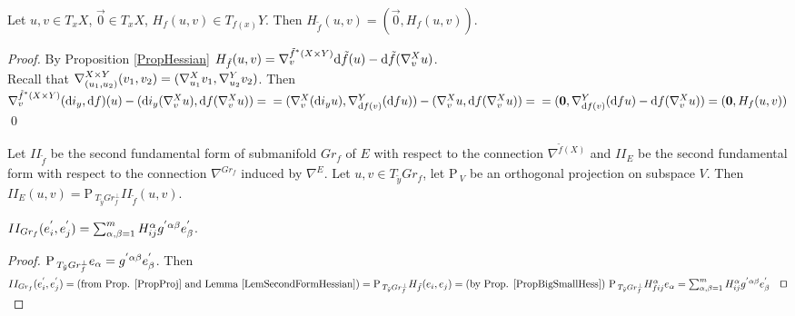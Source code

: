 \documentclass{llncs}
\newcommand{\Proj}{\mathrm{P}{\,}}
\newcommand{\CovariantDiffManif}[1]{\nabla^{#1}}
\newcommand{\CovariantDerivManif}[2]{\tensor*{\nabla}{^{#1}_{#2}}}
\newcommand{\Diff}{\mathrm{d}}
\newcommand {\Preimage}[2]{{#2}^*{#1}}
\begin{document}
\begin{proposition} \label{PropBigSmallHess}
Let $u, v \in T_xX$, $\vec{0} \in T_xX$, $H_f(u, v) \in T_{f(x)}Y$.
Then $H_{\tilde{f}}(u, v) = (\vec{0}, H_f(u, v))$.
\end{proposition}

\begin{proof}
By Proposition \ref{PropHessian} 
$H_{\tilde{f}}(u, v)=\CovariantDerivManif{\Preimage{(X \times Y)}{\tilde{f}}} {v} \Diff \tilde{f}(u) - 
							\Diff \tilde{f}( 
							\CovariantDerivManif{X}{v}u
							)$.
\\
Recall that $\CovariantDerivManif{X\times Y}{(u_1, u_2)}{(v_1, v_2)} = (\CovariantDerivManif{X}{u_1}{v_1}, \CovariantDerivManif{Y}{u_2}{v_2})$. Then
							\\
							$\CovariantDerivManif{\Preimage{(X \times Y)}{\tilde{f}}}{v} (\Diff i_y, \Diff f)(u) 							
							 - (\Diff i_y( 
							\CovariantDerivManif{X}{v}u
							), \Diff f( 
							\CovariantDerivManif{X}{v}u
							)) = 
							\\
							=(\CovariantDerivManif{X}{v} (\Diff i_y u), \CovariantDerivManif{Y}{\Diff f(v)} (\Diff f u)) - 
							(\CovariantDerivManif{X}{v}u, \Diff f( 
							\CovariantDerivManif{X}{v}u)
							) =
							\\
							=(\vec{0}, \CovariantDerivManif{Y}{\Diff f(v)} (\Diff f u) - \Diff f( 
							\CovariantDerivManif{X}{v}u)) =
							(\vec{0}, H_f(u, v))$ \textrm{\qed }

\end{proof}

\begin{proposition} \label{PropProj}
Let $II_{\tilde{f}}$ be the second fundamental form of submanifold $Gr_f$ of $E$ with respect to the connection $\CovariantDiffManif{\tilde{f}(X)}$ and $II_E$ be the second fundamental form with respect to the connection $\CovariantDiffManif{Gr_f}$ induced by $\CovariantDiffManif{E}$. 
Let $u, v \in T_{\tilde{y}}Gr_f$, let $\Proj_V$ be an orthogonal projection on subspace $V$. Then $II_E(u, v) = \Proj_{T_{\tilde{y}}Gr_f^{\bot}} II_{\tilde{f}}(u, v)$.
\end{proposition}

\begin{lemma} \label{LemSecondHessianFormula}
$II_{Gr_f}(e_i^{'}, e_j^{'})=\sum_{\alpha, \beta=1}^{m} \tensor*{H}{^{\alpha}_i_j} \tensor*{g}{^{'}^{\alpha}^{\beta}} e_{\beta}^{'}$.
\end{lemma}

\begin{proof}
$\Proj_{T_{\tilde{y}}Gr_f^{\bot}}e_{\alpha} = \tensor*{g}{^{'}^{\alpha}^{\beta}} e_{\beta}^{'}$. Then 
$
II_{Gr_f}(e_i^{'}, e_j^{'}) = \textrm{(from Prop. \ref{PropProj} and Lemma \ref{LemSecondFormHessian})} 
\\
=\Proj_{T_{\tilde{y}}Gr_f^{\bot}} H_{\tilde{f}}(e_i, e_j)
=\textrm{(by Prop. \ref{PropBigSmallHess}) } \Proj_{T_{\tilde{y}}Gr_f^{\bot}} \tensor*{H}{^{\alpha}_f_i_j}e_{\alpha} 
= \sum_{\alpha, \beta=1}^{m} \tensor*{H}{^{\alpha}_i_j} \tensor*{g}{^{'}^{\alpha}^{\beta}} e_{\beta}^{'}
\textrm{\qed}
$
\end{proof}
\end{document}
